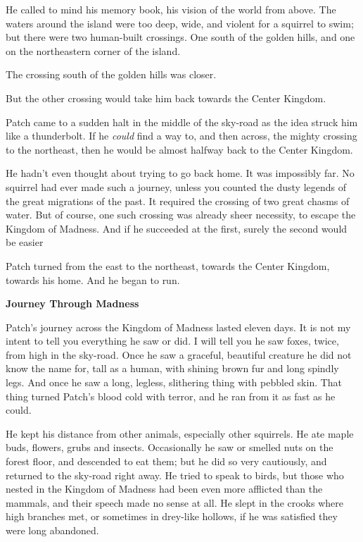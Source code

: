 \documentclass[11pt]{article}
\begin{document}
He called to mind his memory book, his vision of the world from above. The waters around the island were too deep, wide, and violent for a squirrel to swim; but there were two human-built crossings. One south of the golden hills, and one on the northeastern corner of the island.\par
The crossing south of the golden hills was closer.\par
But the other crossing would take him back towards the Center Kingdom.\par
 Patch came to a sudden halt in the middle of the sky-road as the idea struck him like a thunderbolt. If he {\it could} find a way to, and then across, the mighty crossing to the northeast, then he would be almost halfway back to the Center Kingdom.\par
 He hadn't even thought about trying to go back home. It was impossibly far. No squirrel had ever made such a journey, unless you counted the dusty legends of the great migrations of the past. It required the crossing of two great chasms of water. But of course, one such crossing was already sheer necessity, to escape the Kingdom of Madness. And if he succeeded at the first, surely the second would be easier %
\par
 Patch turned from the east to the northeast, towards the Center Kingdom, towards his home. And he began to run.\par
\par
{\bf Journey Through Madness\par
}\par
 Patch's journey across the Kingdom of Madness lasted eleven days. It is not my intent to tell you everything he saw or did. I will tell you he saw foxes, twice, from high in the sky-road. Once he saw a graceful, beautiful creature he did not know the name for, tall as a human, with shining brown fur and long spindly legs. And once he saw a long, legless, slithering thing with pebbled skin. That thing turned Patch's blood cold with terror, and he ran from it as fast as he could.\par
 He kept his distance from other animals, especially other squirrels. He ate maple buds, flowers, grubs and insects. Occasionally he saw or smelled nuts on the forest floor, and descended to eat them; but he did so very cautiously, and returned to the sky-road right away. He tried to speak to birds, but those who nested in the Kingdom of Madness had been even more afflicted than the mammals, and their speech made no sense at all. He slept in the crooks where high branches met, or sometimes in drey-like hollows, if he was satisfied they were long abandoned.\par
\end{document}
